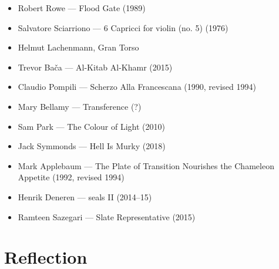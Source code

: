 \begin{itemize}
    \item Robert Rowe --- Flood Gate (1989)
    \item Salvatore Sciarriono --- 6 Capricci for violin (no. 5) (1976) 
    \item Helmut Lachenmann, Gran Torso
    \item Trevor Bača --- Al-Kitab Al-Khamr (2015)
    \item Claudio Pompili --- Scherzo Alla Francescana (1990, revised 1994)
    \item Mary Bellamy --- Transference (?)
    \item Sam Park --- The Colour of Light (2010)
    \item Jack Symmonds --- Hell Is Murky (2018)
    \item Mark Applebaum --- The Plate of Transition Nourishes the Chameleon Appetite (1992, revised 1994)
    \item Henrik Deneren --- seals II (2014--15)
    \item Ramteen Sazegari --- Slate Representative (2015)
\end{itemize}

\section{Reflection}




\lipsum[4]